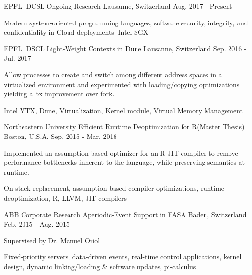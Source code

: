 


\begin{cventries}

\cventry
{EPFL, DCSL}
{Ongoing Research}
{Lausanne, Switzerland}
{Aug. 2017 - Present}
{
	\begin{cvitems}
	\item{Modern system-oriented programming languages, software security, integrity, and confidentiality in Cloud deployments, Intel SGX}
	\end{cvitems}
}


\cventry
{EPFL, DSCL}
{Light-Weight Contexts in Dune}
{Lausanne, Switzerland}
{Sep. 2016 - Jul. 2017}
{
	\begin{cvitems}
	\item{Allow processes to create and switch among different address spaces in a virtualized environment and experimented with loading/copying optimizations yielding a 5x improvement over fork.}
	\item{Intel VTX, Dune, Virtualization, Kernel module, Virtual Memory Management}
	\end{cvitems}
}

\cventry
{Northeastern University} %
{Efficient Runtime Deoptimization for R(Master Thesis)} %
{Boston, U.S.A.} %
{Sep. 2015 - Mar. 2016} %
{ %
\begin{cvitems}
\item{Implemented an assumption-based optimizer for an R JIT compiler to remove performance bottlenecks inherent to the language, while preserving semantics at runtime.}
\item {On-stack replacement, assumption-based compiler optimizations, runtime deoptimization, R, LLVM, JIT compilers}
\end{cvitems}
}

\cventry
{ABB Corporate Research}
{Aperiodic-Event Support in FASA}
{Baden, Switzerland}
{Feb. 2015 - Aug. 2015}
{
	\begin{cvitems}
	\item{Supervised by Dr. Manuel Oriol}
	\item{Fixed-priority servers, data-driven events, real-time control applications, kernel design, dynamic linking/loading \& software updates, pi-calculus}
	\end{cvitems}
}


\end{cventries}
